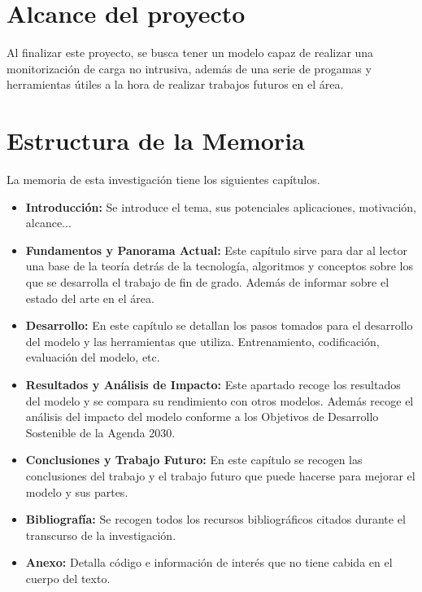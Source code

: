 \section{Alcance del proyecto}
\label{sec:alcanceproyecto}
Al finalizar este proyecto, se busca tener un modelo capaz de realizar una monitorización de carga no intrusiva, además de una serie de progamas y herramientas útiles a la hora de realizar trabajos futuros en el área.

\section{Estructura de la Memoria}
\label{sec:estructuramemoria}
La memoria de esta investigación tiene los siguientes capítulos.
\begin{itemize}
	\item \textbf{Introducción: } Se introduce el tema, sus potenciales aplicaciones, motivación, alcance... 
	\item \textbf{Fundamentos y Panorama Actual: } Este capítulo sirve para dar al lector una base de la teoría detrás de la tecnología, algoritmos y conceptos sobre los que se desarrolla el trabajo de fin de grado. Además de informar sobre el estado del arte en el área.
	\item \textbf{Desarrollo: } En este capítulo se detallan los pasos tomados para el desarrollo del modelo y las herramientas que utiliza. Entrenamiento, codificación, evaluación del modelo, etc. 
	\item \textbf{Resultados y Análisis de Impacto: } Este apartado recoge los resultados del modelo y se compara su rendimiento con otros modelos. Además recoge el análisis del impacto del modelo conforme a los Objetivos de Desarrollo Sostenible de la Agenda 2030.
	\item \textbf{Conclusiones y Trabajo Futuro: } En este capítulo se recogen las conclusiones del trabajo y el trabajo futuro que puede hacerse para mejorar el modelo y sus partes. 
	\item \textbf{Bibliografía: } Se recogen todos los recursos bibliográficos citados durante el transcurso de la investigación.
	\item \textbf{Anexo: } Detalla código e información de interés que no tiene cabida en el cuerpo del texto. 
\end{itemize}



